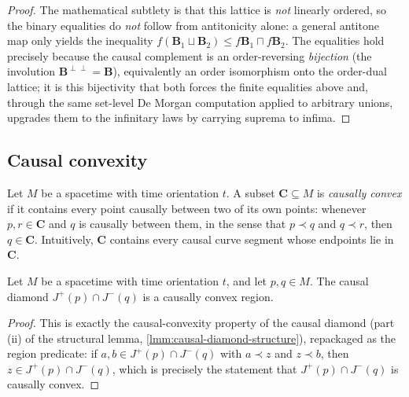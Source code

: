 \begin{proof}
    The mathematical subtlety is that this lattice is \emph{not} linearly ordered, so the binary equalities do \emph{not} follow from antitonicity alone: a general antitone map only yields the inequality $f(\mathbf{B}_1 \sqcup \mathbf{B}_2) \le f\mathbf{B}_1 \sqcap f\mathbf{B}_2$. The equalities hold precisely because the causal complement is an order-reversing \emph{bijection} (the involution $\mathbf{B}^{\perp\perp} = \mathbf{B}$), equivalently an order isomorphism onto the order-dual lattice; it is this bijectivity that both forces the finite equalities above and, through the same set-level De Morgan computation applied to arbitrary unions, upgrades them to the infinitary laws by carrying suprema to infima.
\end{proof}

\subsection{Causal convexity}

\begin{definition}
    \label{def:causally-convex-region}
    \leanok
    Let $M$ be a spacetime with time orientation $t$. A subset $\mathbf{C} \subseteq M$ is \emph{causally convex} if it contains every point causally between two of its own points: whenever $p, r \in \mathbf{C}$ and $q$ is causally between them, in the sense that $p \prec q$ and $q \prec r$, then $q \in \mathbf{C}$. Intuitively, $\mathbf{C}$ contains every causal curve segment whose endpoints lie in $\mathbf{C}$.
\end{definition}

\begin{lemma}
    \label{lmm:causal-diamond-causally-convex}
    \leanok
    Let $M$ be a spacetime with time orientation $t$, and let $p, q \in M$. The causal diamond $J^+(p) \cap J^-(q)$ is a causally convex region.
\end{lemma}
\begin{proof}
    \leanok
    This is exactly the causal-convexity property of the causal diamond (part (ii) of the structural lemma, \ref{lmm:causal-diamond-structure}), repackaged as the region predicate: if $a, b \in J^+(p) \cap J^-(q)$ with $a \prec z$ and $z \prec b$, then $z \in J^+(p) \cap J^-(q)$, which is precisely the statement that $J^+(p) \cap J^-(q)$ is causally convex.
\end{proof}

